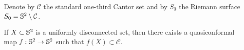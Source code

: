 \documentclass{amsart}
\begin{document}
Denote by $\mathcal{C}$ the standard one-third Cantor set and by $S_0$ the Riemann surface $S_0 = \S^2 \setminus  \mathcal{C}$.

\begin{lemma}\label{lem:ud}
If $X\subset \S^2$ is a uniformly disconnected set, then there exists a quasiconformal map $f:\S^2 \to\S^2$ such that $f(X)\subset \mathcal{C}$.
\end{lemma}


%
%
%
\end{document}
